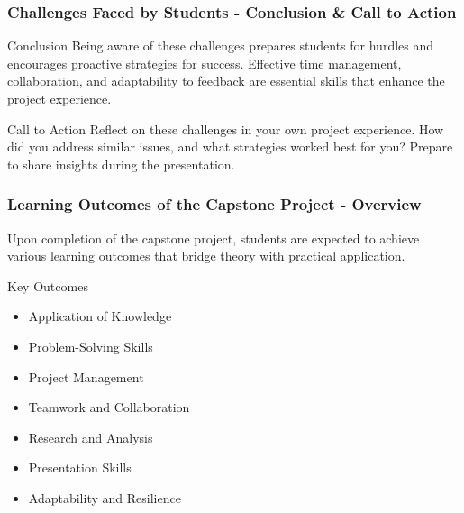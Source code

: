 \documentclass{beamer}
\begin{document}
\begin{frame}[fragile]
    \frametitle{Challenges Faced by Students - Conclusion \& Call to Action}
    \begin{block}{Conclusion}
        Being aware of these challenges prepares students for hurdles and encourages proactive strategies for success. Effective time management, collaboration, and adaptability to feedback are essential skills that enhance the project experience.
    \end{block}
    
    \begin{block}{Call to Action}
        Reflect on these challenges in your own project experience. How did you address similar issues, and what strategies worked best for you? Prepare to share insights during the presentation.
    \end{block}
\end{frame}

\begin{frame}[fragile]
    \frametitle{Learning Outcomes of the Capstone Project - Overview}
    Upon completion of the capstone project, students are expected to achieve various learning outcomes that bridge theory with practical application.

    \begin{block}{Key Outcomes}
        \begin{itemize}
            \item Application of Knowledge
            \item Problem-Solving Skills
            \item Project Management
            \item Teamwork and Collaboration
            \item Research and Analysis
            \item Presentation Skills
            \item Adaptability and Resilience
        \end{itemize}
    \end{block}
\end{frame}
\end{document}
